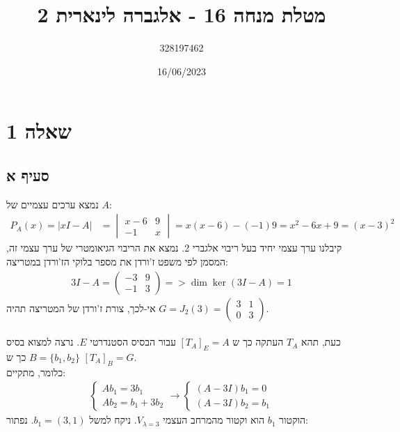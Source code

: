 \documentclass{article}
\title{מטלת מנחה 16 - אלגברה לינארית 2}
\author{328197462}
\date{16/06/2023}
\begin{document}
\maketitle

\section*{שאלה 1}
\subsection*{סעיף א}

נמצא ערכים עצמיים של $A$:
\begin{align*}
    P_A(x)=|xI-A| & =\begin{vmatrix}
                         x-6 & 9 \\
                         -1  & x
                     \end{vmatrix}=x(x-6)-(-1)9=x^2-6x+9=(x-3)^2
\end{align*}
קיבלנו ערך עצמי יחיד בעל ריבוי אלגברי 2. נמצא את הריבוי הגיאומטרי של ערך עצמי זה, המסמן לפי משפט ז'ורדן את מספר בלוקי הז'ורדן במטריצה:
\begin{align*}
    3I-A=\begin{pmatrix}
             -3 & 9 \\
             -1 & 3
         \end{pmatrix} => \dim\ker(3I-A)=1
\end{align*}
אי-לכך, צורת ז'ורדן של המטריצה תהיה $G=J_2(3)=\begin{pmatrix}
        3 & 1 \\
        0 & 3
    \end{pmatrix}$. \\\\
כעת, תהא $T_A$ העתקה כך ש $[T_A]_E=A$ עבור הבסיס הסטנדרטי $E$. נרצה למצוא בסיס $B=\{ b_1, b_2 \}$ כך ש $[T_A]_B=G$. \\
כלומר, מתקיים:
\begin{align*}
    \begin{cases}
        Ab_1=3b_1 \\
        Ab_2=b_1+3b_2
    \end{cases} \rightarrow \begin{cases}
                                (A-3I)b_1=0 \\
                                (A-3I)b_2=b_1
                            \end{cases}
\end{align*}
הוקטור $b_1$ הוא וקטור מהמרחב העצמי $V_{\lambda=3}$. ניקח למשל $b_1=(3,1)$. נפתור:
\end{document}
